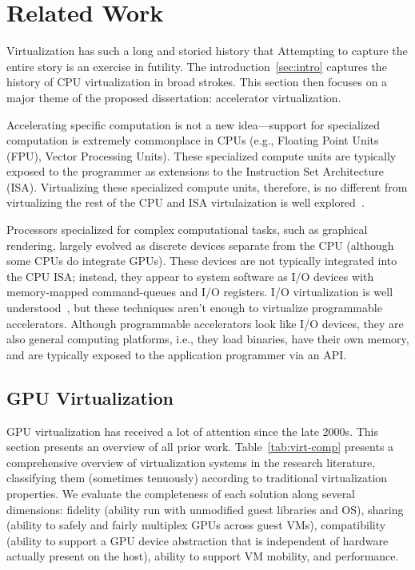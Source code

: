 \chapter{Related Work}
\label{sec:related}

Virtualization has such a long and storied history that Attempting to capture
the entire story is an exercise in futility. The introduction~\ref{sec:intro}
captures the history of CPU virtualization in broad strokes. This section then
focuses on a major theme of the proposed dissertation:
accelerator virtualization.

Accelerating specific computation is not a new idea---support for specialized
computation is extremely commonplace in CPUs (e.g., Floating Point Units
(FPU), Vector Processing Units). These specialized compute units are
typically exposed to the programmer as extensions to the Instruction Set
Architecture (ISA). Virtualizing these specialized compute units, therefore,
is no different from virtualizing the rest of the CPU and ISA virtulaization
is well explored~\cite{cp40,vm370,popek-goldberg,bugnion-disco,
bugnion-nieh-tsafrir,bugnion-workstation}.

Processors specialized for complex computational tasks, such as graphical
rendering, largely evolved as discrete devices separate from the CPU (although
some CPUs do integrate GPUs). These devices are not typically integrated into
the CPU ISA; instead, they appear to system software as I/O devices with
memory-mapped command-queues and I/O registers. I/O virtualization is well
understood~\cite{waldspurger12cacm,paradice,Kuperman_undated-io,Sig2010-ml,
zeng2013improved,abramson2006intel}, but these techniques aren't enough to
virtualize programmable accelerators. Although programmable accelerators look
like I/O devices, they are also general computing platforms, i.e., they load
binaries, have their own memory, and are typically exposed to the application
programmer via an API.

\section{GPU Virtualization}
GPU virtualization has received a lot of attention since the late 2000s. This
section presents an overview of all prior work.
Table~\ref{tab:virt-comp} presents a comprehensive overview of virtualization
systems in the research literature, classifying them (sometimes tenuously)
according to traditional virtualization properties.
We evaluate the completeness of each solution along several dimensions:
fidelity (ability run with unmodified guest libraries and OS), sharing (ability to safely and fairly multiplex GPUs across guest VMs), compatibility (ability to support a GPU device abstraction that is independent of hardware actually present on the host), ability to support VM mobility, and performance.

